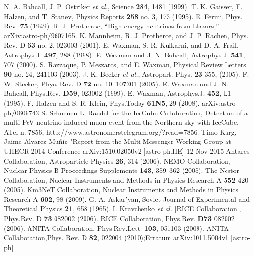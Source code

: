 \begin{thebibliography}{1}
 N. A. Bahcall, J. P. Ostriker {\it et al.}, Science \textbf{284}, 1481 (1999).
  T. K. Gaisser, F. Halzen, and T. Stanev, Physics Reports \textbf{258} no. 3, 173 (1995).
 E. Fermi, Phys. Rev. \textbf{75} (1949).
 R. J. Protheroe, “High energy neutrinos from blazars,” arXiv:astro-ph/9607165.
  K. Mannheim, R. J. Protheroe, and J. P. Rachen,  Phys. Rev. D \textbf{63} no. 2, 023003 (2001).
 E. Waxman, S. R. Kulkarni, and D. A. Frail,  Astrophys.J. \textbf{497}, 288 (1998).
 E. Waxman and J. N. Bahcall, Astrophys.J. \textbf{541}, 707 (2000).
 S. Razzaque, P. Meszaros, and E. Waxman, Physical Review Letters \textbf{90} no. 24, 241103 (2003).
  J. K. Becker {\it et al.}, Astropart. Phys. \textbf{23} 355, (2005).
 F. W. Stecker, Phys. Rev. D \textbf{72} no. 10,  107301 (2005).
 E. Waxman and J. N. Bahcall, Phys.Rev. \textbf{D59},  023002 (1999).
  E. Waxman,  Astrophys.J. \textbf{452},  L1 (1995).
 F. Halzen and S. R. Klein, Phys.Today \textbf{61N5}, 29 (2008).
 arXiv:astro-ph/0609743
 S. Schoenen L. Raedel for the IceCube Collaboration, Detection of a multi-PeV neutrino-induced muon event from the Northern sky with IceCube, ATel n. 7856, http://www.astronomerstelegram.org/?read=7856.
 Timo Karg, Jaime Alvarez-Mu\~niz "Report from the Multi-Messenger Working Group at UHECR-2014 Conference arXiv:1510.02050v2 [astro-ph.HE] 12 Nov 2015
 Antares Collaboration, Astroparticle Physics \textbf{26}, 314 (2006).
 NEMO Collaboration, Nuclear Physics B Proceedings Supplements \textbf{143},  359–362 (2005).
  The Nestor Collaboration,  Nuclear Instruments and Methods in Physics Research A \textbf{552} 420 (2005).
  Km3NeT Collaboration, Nuclear Instruments and Methods in Physics Research A \textbf{602}, 98 (2009).
  G. A. Askar’yan, Soviet Journal of Experimental and Theoretical Physics \textbf{21}, 658 (1965).
 I. Kravchenko {\it et al.} [RICE Collaboration], Phys.Rev. D \textbf{73} 082002 (2006).
 RICE Collaboration, Phys.Rev. \textbf{D73}  082002 (2006).
 ANITA Collaboration, Phys.Rev.Lett. \textbf{103},  051103 (2009).
ANITA Collaboration,Phys. Rev. D \textbf{82}, 022004 (2010);\newline Erratum arXiv:1011.5004v1 [astro-ph]

\end{thebibliography}
